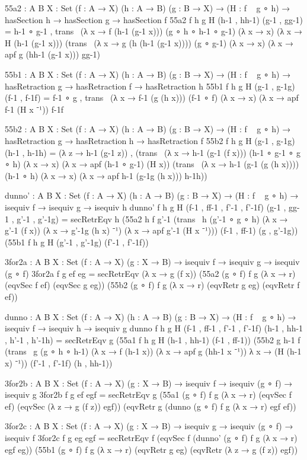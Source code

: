 \documentclass[11pt, a4paper]{article}
\begin{document}
\begin{code}
  55a2 : {A B X : Set} (f : A → X) (h : A → B) (g : B → X) → (H : f ~ g ∘ h) → hasSection h → hasSection g → hasSection f
  55a2 f h g H (h-1 , hh-1) (g-1 , gg-1) = h-1 ∘ g-1 , trans~ (λ x → f (h-1 (g-1 x))) (g ∘ h ∘ h-1 ∘ g-1) (λ x → x) (λ x → H (h-1 (g-1 x)))
    (trans~ (λ x → g (h (h-1 (g-1 x)))) (g ∘ g-1) (λ x → x) (λ x → apf g (hh-1 (g-1 x))) gg-1)

  55b1 : {A B X : Set} (f : A → X) (h : A → B) (g : B → X) → (H : f ~ g ∘ h) → hasRetraction g → hasRetraction f → hasRetraction h
  55b1 f h g H (g-1 , g-1g) (f-1 , f-1f) = f-1 ∘ g , trans~ (λ x → f-1 (g (h x))) (f-1 ∘ f) (λ x → x) (λ x → apf f-1 (H x ⁻¹)) f-1f

  55b2 : {A B X : Set} (f : A → X) (h : A → B) (g : B → X) → (H : f ~ g ∘ h) → hasRetraction g → hasRetraction h → hasRetraction f
  55b2 f h g H (g-1 , g-1g) (h-1 , h-1h) = (λ z → h-1 (g-1 z)) , (trans~ (λ x → h-1 (g-1 (f x))) (h-1 ∘ g-1 ∘ g ∘ h) (λ x → x) (λ x → apf (h-1 ∘ g-1) (H x))
    (trans~ (λ x → h-1 (g-1 (g (h x)))) (h-1 ∘ h) (λ x → x) (λ x → apf h-1 (g-1g (h x))) h-1h))

  dunno' : {A B X : Set} (f : A → X) (h : A → B) (g : B → X) → (H : f ~ g ∘ h) → isequiv f → isequiv g → isequiv h
  dunno' f h g H (f-1 , ff-1 , f'-1 , f'-1f) (g-1 , gg-1 , g'-1 , g'-1g) = secRetrEqv h (55a2 h f g'-1 (trans~ h (g'-1 ∘ g ∘ h) (λ x → g'-1 (f x)) (λ x → g'-1g (h x) ⁻¹) (λ x → apf g'-1 (H x ⁻¹))) (f-1 , ff-1) (g , g'-1g)) (55b1 f h g H (g'-1 , g'-1g) (f'-1 , f'-1f))

  3for2a : {A B X : Set} (f : A → X) (g : X → B) → isequiv f → isequiv g → isequiv (g ∘ f)
  3for2a f g ef eg = secRetrEqv (λ x → g (f x)) (55a2 (g ∘ f) f g (λ x → r) (eqvSec f ef) (eqvSec g eg))
                                                (55b2 (g ∘ f) f g (λ x → r) (eqvRetr g eg) (eqvRetr f ef))

  dunno : {A B X : Set} (f : A → X) (h : A → B) (g : B → X) → (H : f ~ g ∘ h) → isequiv f → isequiv h → isequiv g
  dunno f h g H (f-1 , ff-1 , f'-1 , f'-1f) (h-1 , hh-1 , h'-1 , h'-1h) = secRetrEqv g (55a1 f h g H (h-1 , hh-1) (f-1 , ff-1))
    (55b2 g h-1 f (trans~ g (g ∘ h ∘ h-1) (λ x → f (h-1 x)) (λ x → apf g (hh-1 x ⁻¹)) λ x → (H (h-1 x) ⁻¹)) (f'-1 , f'-1f) (h , hh-1))

  3for2b : {A B X : Set} (f : A → X) (g : X → B) → isequiv f → isequiv (g ∘ f) → isequiv g
  3for2b f g ef egf = secRetrEqv g (55a1 (g ∘ f) f g (λ x → r) (eqvSec f ef) (eqvSec (λ z → g (f z)) egf)) (eqvRetr g (dunno (g ∘ f) f g (λ x → r) egf ef))

  3for2c : {A B X : Set} (f : A → X) (g : X → B) → isequiv g → isequiv (g ∘ f) → isequiv f
  3for2c f g eg egf = secRetrEqv f (eqvSec f (dunno' (g ∘ f) f g (λ x → r) egf eg)) (55b1 (g ∘ f) f g (λ x → r) (eqvRetr g eg) (eqvRetr (λ z → g (f z)) egf))

\end{code}
\end{document}

